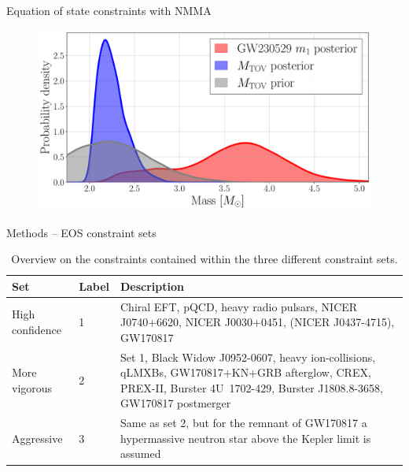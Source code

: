\documentclass[usenames,dvipsnames,t]{beamer}
\begin{document}
\begin{frame}{Equation of state constraints with \textsc{NMMA}}
\vspace{\x}
\begin{figure}
  \centering
  \includegraphics[width=0.7\linewidth]{Figures/mtov_gw230529_set_L1.pdf}
\end{figure}
\end{frame}


\begin{frame}{Methods -- EOS constraint sets}

  \small
\begin{table}[t]
  \renewcommand{\arraystretch}{1.1}
  \caption{Overview on the constraints contained within the three different constraint sets.}
  \label{tab:sets}
  \begin{tabular}{ l l p{7cm}}
  \toprule
  \toprule
  Set & Label & Description \\
  \midrule
  High confidence & 1 & Chiral EFT, pQCD, heavy radio pulsars, NICER \mbox{J0740+6620}, NICER \mbox{J0030+0451}, (NICER \mbox{J0437-4715}), GW170817\\
  \midrule
  More vigorous & 2 & Set 1, Black Widow \mbox{J0952-0607}, heavy ion-collisions, qLMXBs, GW170817+KN+GRB afterglow, CREX, PREX-II, Burster \mbox{4U 1702-429}, Burster \mbox{J1808.8-3658}, GW170817 postmerger\\
  \midrule
  Aggressive & 3 & Same as set 2, but for the remnant of GW170817 a hypermassive neutron star above the Kepler limit is assumed \\
  \bottomrule
  \end{tabular}
\end{table} 
\normalsize

\end{frame}
\end{document}
